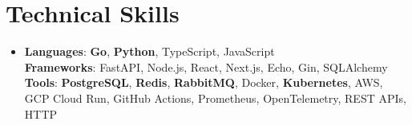 \documentclass[letterpaper,11pt]{article}
\begin{document}
\section{Technical Skills}
\begin{itemize}[leftmargin=0.15in, label={}, topsep=0pt, itemsep=0pt, parsep=0pt, partopsep=0pt]
  \item{\fontsize{9.6pt}{10.0pt}\selectfont
   \textbf{Languages}{: \textbf{Go}, \textbf{Python}, TypeScript, JavaScript} \\
   \textbf{Frameworks}{: FastAPI, Node.js, React, Next.js, Echo, Gin, SQLAlchemy} \\
   \textbf{Tools}{: \textbf{PostgreSQL}, \textbf{Redis}, \textbf{RabbitMQ}, Docker, \textbf{Kubernetes}, AWS, GCP Cloud Run, GitHub Actions, Prometheus, OpenTelemetry, REST APIs, HTTP} \\
  }
\end{itemize}
\end{document}
